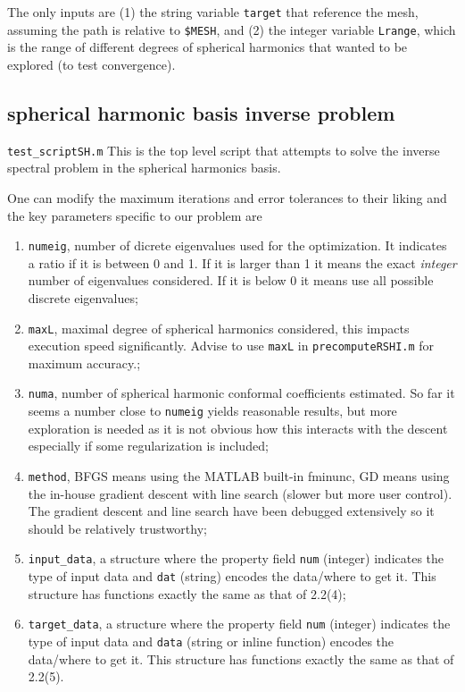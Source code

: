 \documentclass[11pt]{article}
\theoremstyle{definition}
\begin{document}
The only inputs are (1) the string variable \verb|target| that reference the mesh, assuming the path is relative to \verb|$MESH|, and (2) the integer variable \verb|Lrange|, which is the range of different degrees of spherical harmonics that wanted to be explored (to test convergence). 

\subsection{spherical harmonic basis inverse problem}
\verb|test_scriptSH.m|
This is the top level script that attempts to solve the inverse spectral problem in the spherical harmonics basis. 

One can modify the maximum iterations and error tolerances to their liking and the key parameters specific to our problem are
\begin{enumerate}
	\item \verb|numeig|, number of dicrete eigenvalues used for the optimization. It indicates a ratio if it is between 0 and 1. If it is larger than 1 it means the exact \textit{integer} number of eigenvalues considered. If it is below 0 it means use all possible discrete eigenvalues;
	
	\item \verb|maxL|, maximal degree of spherical harmonics considered, this impacts execution speed significantly. Advise to use \verb|maxL| in \verb|precomputeRSHI.m| for maximum accuracy.;
	
	\item \verb|numa|, number of spherical harmonic conformal coefficients estimated. So far it seems a number close to \verb|numeig| yields reasonable results, but more exploration is needed as it is not obvious how this interacts with the descent especially if some regularization is included;
	
	\item \verb|method|, BFGS means using the MATLAB built-in fminunc, GD means using the in-house gradient descent with line search (slower but more user control). The gradient descent and line search have been debugged extensively so it should be relatively trustworthy;
	
	\item \verb|input_data|, a structure where the property field \verb|num| (integer) indicates the type of input data and \verb|dat| (string) encodes the data/where to get it. This structure has functions exactly the same as that of 2.2(4);
	
	\item \verb|target_data|, a structure where the property field \verb|num| (integer) indicates the type of input data and \verb|data| (string or inline function) encodes the data/where to get it. This structure has functions exactly the same as that of 2.2(5).
\end{enumerate}
\end{document}
